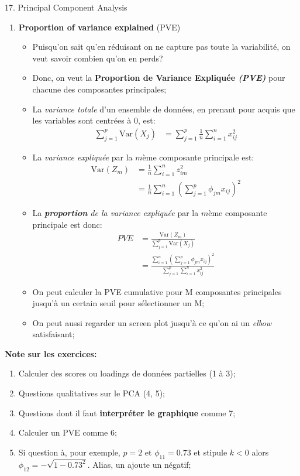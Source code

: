 \documentclass[12pt, titlepage, french]{report}
\begin{document}
\begin{CHPT_SUMM}[label = {PCA-PCA}]{17. Principal Component Analysis}
\begin{enumerate}
\begin{itemize}
		\texttt{[image: src/PCA-SCALING.png]}
		\end{itemize}
	\item	\textbf{Proportion of variance explained} (PVE)
		\begin{itemize}
		\item	Puisqu'on sait qu'en réduisant on ne capture pas toute la variabilité, on veut savoir combien qu'on en perds?
		\item	Donc, on veut la \textbf{Proportion de Variance Expliquée \textit{(PVE)}} pour chacune des composantes principales;
		\item	La \textit{variance totale} d'un ensemble de données, en prenant pour acquis que les variables sont centrées à 0, est:
			\begin{align*}
			\sum_{j = 1}^{p} \text{Var}(X_{j})	&=	\sum_{j = 1}^{p} \frac{1}{n} \sum_{i = 1}^{n} x_{ij}^{2}
			\end{align*}
		\item	La \textit{variance expliquée} par la $m$ème composante principale est:
			\begin{align*}
			\text{Var}(Z_{m})
			&=	\frac{1}{n} \sum_{i = 1}^{n}	z^{2}_{im} \\
			&= \frac{1}{n} \sum_{i = 1}^{n} \left( \sum_{j = 1}^{p} \phi_{jm} x_{ij} \right)^{2}
			\end{align*}
		\item	La \textit{\textbf{proportion} de la variance expliquée} par la $m$ème composante principale est donc:
			\begin{align*}
			PVE	
			&=	\frac{\text{Var}(Z_{m})}{\sum_{j = 1}^{p} \text{Var}(X_{j})}	\\
			&=	\frac{\sum_{i = 1}^{n} \left( \sum_{j = 1}^{p} \phi_{jm} x_{ij} \right)^{2}}{\sum_{j = 1}^{p} \sum_{i = 1}^{n} x_{ij}^{2}}	
			\end{align*}
		\item	On peut calculer la PVE cumulative pour M composantes principales jusqu'à un certain seuil pour sélectionner un M;
		\item	On peut aussi regarder un screen plot jusqu'à ce qu'on ai un \textit{elbow} satisfaisant;
		\end{itemize}
\end{enumerate}

\textbf{Note sur les exercices:} 
\begin{enumerate}
	\item	Calculer des scores ou loadings de données partielles (1 à 3);
	\item	Questions qualitatives sur le PCA (4, 5);
	\item	Questions dont il faut \textbf{interpréter le graphique} comme 7;
	\item	Calculer un PVE comme 6;
	\item	Si question à, pour exemple, $p = 2$ et $\phi_{11} = 0.73$ et stipule $k < 0$ alors $\phi_{12} = -\sqrt{1 - 0.73^{2}}$. Alias, un ajoute un négatif;
\end{enumerate}
\end{CHPT_SUMM}
\end{document}

